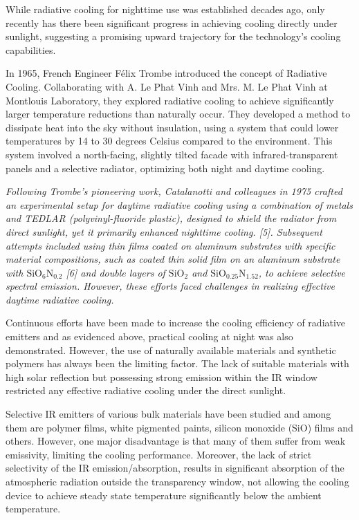 While radiative cooling for nighttime use was established decades ago, only recently has there been significant progress in achieving cooling directly under sunlight, suggesting a promising upward trajectory for the technology's cooling capabilities.

In 1965, French Engineer Félix Trombe introduced the concept of Radiative Cooling. Collaborating with A. Le Phat Vinh and Mrs. M. Le Phat Vinh at Montlouis Laboratory, they explored radiative cooling to achieve significantly larger temperature reductions than naturally occur. They developed a method to dissipate heat into the sky without insulation, using a system that could lower temperatures by 14 to 30 degrees Celsius compared to the environment. This system involved a north-facing, slightly tilted facade with infrared-transparent panels and a selective radiator, optimizing both night and daytime cooling. %

\emph{Following Trombe's pioneering work, Catalanotti and colleagues in 1975 crafted an experimental setup for daytime radiative cooling using a combination of metals and TEDLAR (polyvinyl-fluoride plastic), designed to shield the radiator from direct sunlight, yet it primarily enhanced nighttime cooling. [5]. Subsequent attempts included using thin films coated on aluminum substrates with specific material compositions, such as coated thin solid film on an aluminum substrate with $\text{SiO}_6\text{N}_{0.2}$ [6] and double layers of $\text{SiO}_2$ and $\text{SiO}_{0.25}\text{N}_{1.52}$, to achieve selective spectral emission. However, these efforts faced challenges in realizing effective daytime radiative cooling.}

Continuous efforts have been made to increase the cooling efficiency of radiative emitters and as evidenced above, practical cooling at night was also demonstrated. However, the use of naturally available materials and synthetic polymers has always been the limiting factor. The lack of suitable materials with high solar reflection but possessing strong emission within the IR window restricted any effective radiative cooling under the direct sunlight. %

Selective IR emitters of various bulk materials have been studied and among them are polymer films, white pigmented paints, silicon monoxide (SiO) films and others. However, one major disadvantage is that many of them suffer from weak emissivity, limiting the cooling performance. Moreover, the lack of strict selectivity of the IR emission/absorption, results in significant absorption of the atmospheric radiation outside the transparency window, not allowing the cooling device to achieve steady state temperature significantly below the ambient temperature. %

